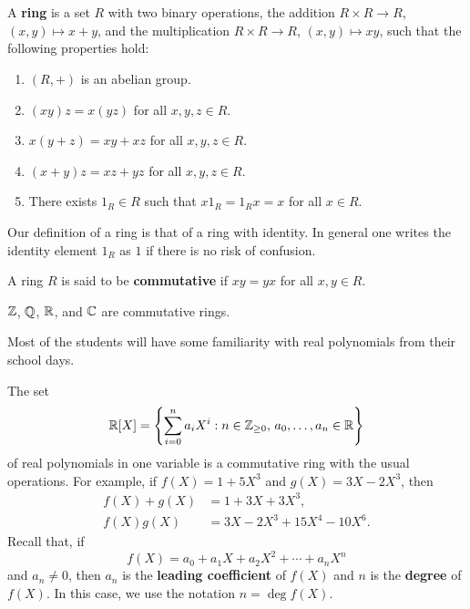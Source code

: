 \chapter{}


\begin{definition}
A \textbf{ring} is a set $R$ with two binary operations, the addition
$R\times R\to R$, $(x,y)\mapsto x+y$, and the multiplication
$R\times R\to R$, $(x,y)\mapsto xy$, such that
the following properties hold:
\begin{enumerate}
    \item $(R,+)$ is an abelian group.
    \item $(xy)z=x(yz)$ for all $x,y,z\in R$.
    \item $x(y+z)=xy+xz$ for all $x,y,z\in R$.
    \item $(x+y)z=xz+yz$ for all $x,y,z\in R$.
    \item There exists $1_R\in R$ such that $x1_R=1_Rx=x$ for all $x\in R$.
\end{enumerate}
\end{definition}

Our definition of a ring is that of a ring with identity. In general one
writes the identity element $1_R$ as $1$ if there is no risk of confusion.

\begin{definition}
A ring $R$ is said to be \textbf{commutative} if $xy=yx$ for all $x,y\in R$. 
\end{definition}

\begin{example}
$\mathbb{Z}$, $\mathbb{Q}$, $\mathbb{R}$, and $\mathbb{C}$ are commutative rings.
\end{example}

Most of the students will have some familiarity with
real polynomials from their school days. 

\begin{example}
    The set  
    \[
		\mathbb{R}[X]=\left\{\sum_{i=0}^na_iX^i:n\in\mathbb{Z}_{\geq0},\,a_0,\dots,a_n\in \mathbb{R}\right\}
    \]
    of real polynomials in one variable 
    is a commutative ring with the usual operations.  
    For example, if $f(X)=1+5X^3$ and $g(X)=3X-2X^3$, then
    \begin{align*}
        f(X)+g(X) &= 1+3X+3X^3,\\
        f(X)g(X) &= 3X-2X^3+15X^4-10X^6.
    \end{align*}
    Recall that, if 
    \[
    f(X)=a_0+a_1X+a_2X^2+\cdots+a_nX^n
    \]
    and $a_n\ne0$, then $a_n$ is the \textbf{leading coefficient} of $f(X)$ and 
    $n$ is the \textbf{degree} of $f(X)$. In this case, we use the notation 
    $n=\deg f(X)$. 
\end{example}


